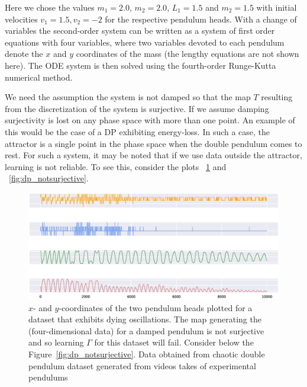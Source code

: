 Here we chose the values $m_1=2.0$, $m_2=2.0$, $L_1=1.5$ and $m_2=1.5$ with initial velocities $v_1=1.5, v_2=-2$ for the respective pendulum heads.
With a change of variables the second-order system can be 
written as a system of first order equations with four variables, where two variables devoted to each pendulum denote the $x$ and $y$ coordinates of the mass (the lengthy equations are not shown here). The ODE system is then solved using the fourth-order Runge-Kutta numerical method.  


We need the assumption the system is not damped so that the map $T$ resulting from the discretization of the system  is surjective.  If we assume damping surjectivity is lost on any phase space with more than one point.  
An example of this would be the case of a DP exhibiting energy-loss. In such a case, the attractor is a single point in the phase space when the double pendulum comes to rest. 
For such a system, it may be noted that if we use data outside the attractor, learning is not reliable. To see this, consider the plots ~\ref{fig:damped_pendulum} and ~\ref{fig:dp_notsurjective}.

\begin{figure}[ht]
  \includegraphics[scale=0.4]{Graphs/_dp_dying.eps}
  \centering
\caption{$x$- and $y$-coordinates of the two pendulum heads plotted for a dataset that exhibits dying oscillations. The map generating the (four-dimensional data) for a damped pendulum is not surjective and so learning $\Gamma$ for this dataset will fail. Consider below the Figure~\ref{fig:dp_notsurjective}. Data obtained from chaotic double pendulum dataset generated from videos takes of experimental pendulums~\cite{asseman2018learning}}
\label{fig:damped_pendulum}
\end{figure}



